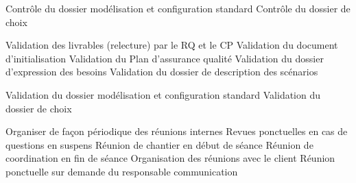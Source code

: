 {            Contrôle du dossier modélisation et configuration standard
            Contrôle du dossier de choix

        Validation des livrables (relecture) par le RQ et le CP
            Validation du document d’initialisation
            Validation du Plan d’assurance qualité
            Validation du dossier d’expression des besoins
            Validation du dossier de description des scénarios

            Validation du dossier modélisation et configuration standard
            Validation du dossier de choix

        Organiser de façon périodique des réunions internes
            Revues ponctuelles en cas de questions en suspens
            Réunion de chantier en début de séance
            Réunion de coordination en fin de séance
        Organisation des réunions avec le client
            Réunion ponctuelle sur demande du responsable communication



}
